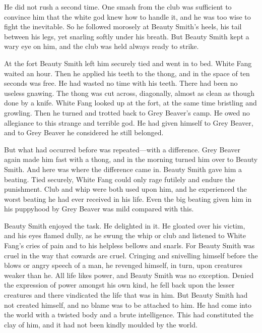 \documentclass[10pt]{book}
\begin{document}
He did not rush a second time. One smash from the club was sufficient
to convince him that the white god knew how to handle it, and he was
too wise to fight the inevitable. So he followed morosely at Beauty
Smith’s heels, his tail between his legs, yet snarling softly under his
breath. But Beauty Smith kept a wary eye on him, and the club was held
always ready to strike.

At the fort Beauty Smith left him securely tied and went in to bed.
White Fang waited an hour. Then he applied his teeth to the thong, and
in the space of ten seconds was free. He had wasted no time with his
teeth. There had been no useless gnawing. The thong was cut across,
diagonally, almost as clean as though done by a knife. White Fang
looked up at the fort, at the same time bristling and growling. Then he
turned and trotted back to Grey Beaver’s camp. He owed no allegiance to
this strange and terrible god. He had given himself to Grey Beaver, and
to Grey Beaver he considered he still belonged.

But what had occurred before was repeated—with a difference. Grey
Beaver again made him fast with a thong, and in the morning turned him
over to Beauty Smith. And here was where the difference came in. Beauty
Smith gave him a beating. Tied securely, White Fang could only rage
futilely and endure the punishment. Club and whip were both used upon
him, and he experienced the worst beating he had ever received in his
life. Even the big beating given him in his puppyhood by Grey Beaver
was mild compared with this.

Beauty Smith enjoyed the task. He delighted in it. He gloated over his
victim, and his eyes flamed dully, as he swung the whip or club and
listened to White Fang’s cries of pain and to his helpless bellows and
snarls. For Beauty Smith was cruel in the way that cowards are cruel.
Cringing and snivelling himself before the blows or angry speech of a
man, he revenged himself, in turn, upon creatures weaker than he. All
life likes power, and Beauty Smith was no exception. Denied the
expression of power amongst his own kind, he fell back upon the lesser
creatures and there vindicated the life that was in him. But Beauty
Smith had not created himself, and no blame was to be attached to him.
He had come into the world with a twisted body and a brute
intelligence. This had constituted the clay of him, and it had not been
kindly moulded by the world.
\end{document}
